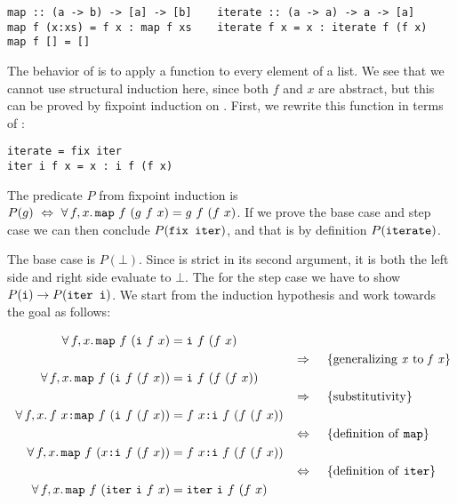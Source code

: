 \begin{verbatim}
map :: (a -> b) -> [a] -> [b]    iterate :: (a -> a) -> a -> [a]
map f (x:xs) = f x : map f xs    iterate f x = x : iterate f (f x)
map f [] = []
\end{verbatim}

The behavior of  is to apply a function to every element of a
list. We see that we cannot use structural induction here, since both
$f$ and $x$ are abstract, but this can be proved by fixpoint induction
on . First, we rewrite this function in terms of :

\begin{verbatim}
iterate = fix iter
iter i f x = x : i f (f x)
\end{verbatim}

The predicate $P$ from fixpoint induction is $P(g) \w \Leftrightarrow
\w \faa{f}{x} \hs{map} \w f \w (g \w f \w x) \eq g \w f \w (f \w x) $. If we
prove the base case and step case we can then conclude
$P(\hs{fix iter})$, and that is by definition $P(\hs{iterate})$.

The base case is $P(\bot)$. Since  is strict in its second
argument, it is both the left side and right side evaluate to $\bot$.
The for the step case we have to show
$P(\hs{i}) \rightarrow P(\hs{iter i})$. We start from the induction
hypothesis and work towards the goal as follows:

\begin{align*}
\w \faa{f}{x} \hs{map} \w f \w (\hs{i} \w f \w x) & \eq \hs{i} \w f \w (f \w x) \\
\descra{generalizing \w \mathit{x} \w to \w \mathit{f \w x}} \\
\w \faa{f}{x} \hs{map} \w f \w (\hs{i} \w f \w (f \w x)) & \eq \hs{i} \w f \w (f \w (f \w x)) \\
\descra{substitutivity} \\
\w \faa{f}{x} f \w x \hs{:} \hs{map} \w f \w (\hs{i} \w f \w (f \w x)) & \eq f \w x \hs{:} \hs{i} \w f \w (f \w (f \w x)) \\
\desclra{definition \w of \w \hs{map}} \\
\w \faa{f}{x} \hs{map} \w f \w (x \hs{:} \hs{i} \w f \w (f \w x)) & \eq f \w x \hs{:} \hs{i} \w f \w (f \w (f \w x)) \\
\desclra{definition \w of \w \hs{iter}} \\
\w \faa{f}{x} \hs{map} \w f \w (\hs{iter} \w \hs{i} \w f \w x) & \eq \hs{iter} \w \hs{i} \w f \w (f \w x) \\
\end{align*}

